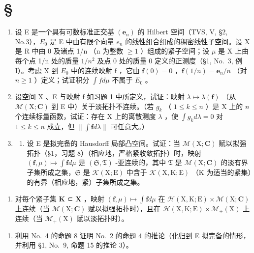\section*{\texorpdfstring{\S\CurrentExerciseGroup}{第{\CurrentExerciseGroup}节}}
{}

\begin{enumerate}
\def\labelenumi{\arabic{enumi})}
\item
  设 E 是一个具有可数标准正交基 \((\mathbf{e}_{n})\) 的 Hilbert 空间（TVS, V, §2, No.3），\(E_{0}\) 是 E 中由有限个向量 \(e_{n}\) 的线性组合组成的稠密线性子空间。设 X 是 R 中由 0 及诸点 1/n （n 为整数 \(\geqslant 1\) ）组成的紧子空间；设 \(\mu\) 是 X 上由每个点 1/n 处的质量 \(1/n^{2}\) 及点 0 处的质量 0 定义的正测度（§1, No.~3, 例 I）。考虑 X 到 \(E_{0}\) 中的连续映射 f ，它由 \(\mathbf{f}(0)=0\) ，\(\mathbf{f}(1/n)=\mathbf{e}_{n}/n\) （对 \(n\geqslant1\) ）定义；试证积分 \(\int f d\mu\) 不属于 \(E_{0}\) 。
\item
  设空间 X 、E 与映射 f 如习题 1 中所定义，试证：映射 \(\lambda \mapsto \lambda(\mathbf{f})\) （从 \(\mathcal{M}(\mathrm{X};\mathbf{C})\) 到 E 中）关于淡拓扑不连续。（若 \(g_{k}\) （ \(1 \leqslant k \leqslant n\) ）是 X 上的 \(n\) 个连续标量函数，试证：存在 X 上的离散测度 \(\lambda\) ，使 \(\int g_{k} d\lambda = 0\) 对 \(1 \leqslant k \leqslant n\) 成立，但 \(\| \int \mathbf{f} d\lambda \|\) 可任意大。）
\item
  \begin{enumerate}
  \def\labelenumii{\alph{enumii})}
  \tightlist
  \item
    设 E 是拟完备的 Hausdorff 局部凸空间。试证：当 \(\mathcal{M}(\mathrm{X};\mathbf{C})\) 赋以拟强拓扑（§1，习题 8）（相应地，严格紧收敛拓扑）时，映射 \((\mathbf{f},\mu)\mapsto\int\mathbf{f}d\mu\) 是 \((\mathfrak{S},\mathfrak{T})\) -亚连续的，其中 \(\mathfrak{T}\) 是 \(\mathcal{M}(\mathrm{X};\mathbf{C})\) 的淡有界子集所成之集，\(\mathfrak{S}\) 是 \(\mathcal{K}(\mathrm{X};\mathrm{E})\) 中含于 \(\mathcal{K}(\mathrm{X},\mathrm{K};\mathrm{E})\) （K 为适当的紧集）的有界（相应地，紧）子集所成之集。
  \end{enumerate}
\end{enumerate}

\begin{enumerate}
\def\labelenumi{\alph{enumi})}
\setcounter{enumi}{1}
\tightlist
\item
  对每个紧子集 \(\mathbf{K}\) ⊂ \(\mathbf{X}\) ，映射 \((\mathbf{f},\mu)\mapsto \int \mathbf{f}d\mu\) 在 \(\mathcal{H}(\mathrm{X},\mathrm{K};\mathrm{E})\times \mathcal{M}(\mathrm{X};\mathbf{C})\) 上连续（当 \(\mathcal{M}(\mathrm{X};\mathbf{C})\) 赋以拟强拓扑时），且在 \(\mathcal{H}(\mathrm{X},\mathrm{K};\mathrm{E})\times \mathcal{M}_{+}(\mathrm{X})\) 上连续（当 \(\mathcal{M}_{+}(\mathrm{X})\) 赋以淡拓扑时）。
\end{enumerate}

\begin{enumerate}
\def\labelenumi{\arabic{enumi})}
\setcounter{enumi}{3}
\tightlist
\item
  利用 No.~4 的命题 8 证明 No.~2 的命题 4 的推论（化归到 E 拟完备的情形，并利用 §1, No.~9, 命题 15 的推论 3）。
\end{enumerate}

\setcounter{exercisegroup}{4}
\edef\CurrentExerciseGroup{\arabic{exercisegroup}}
